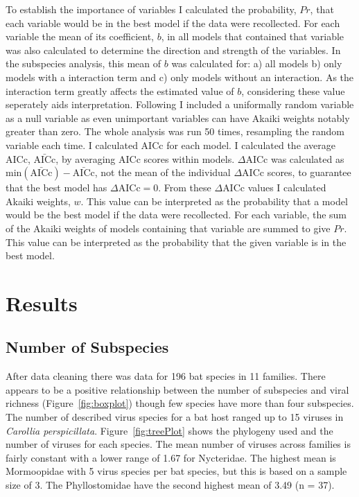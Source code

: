 To establish the importance of variables I calculated the probability, $Pr$, that each variable would be in the best model if the data were recollected.
For each variable the mean of its coefficient, $b$, in all models that contained that variable was also calculated to determine the direction and strength of the variables.
In the subspecies analysis, this mean of $b$ was calculated for: a) all models b) only models with a interaction term and c) only models without an interaction.
As the interaction term greatly affects the estimated value of $b$, considering these value seperately aids interpretation.
Following \cite{whittingham2005habitat} I included a uniformally random variable as a null variable as even unimportant variables can have Akaiki weights notably greater than zero.
The whole analysis was run 50 times, resampling the random variable each time.
I calculated AICc for each model.
I calculated the average AICc, $\bar{\text{AICc}}$, by averaging AICc scores within models.
$\Delta\text{AICc}$ was calculated as $\text{min}(\bar{\text{AICc}}) - \bar{\text{AICc}}$, not the mean of the individual $\Delta\text{AICc}$ scores, to guarantee that the best model has $\Delta\text{AICc} = 0$.
From these $\Delta\text{AICc}$ values I calculated Akaiki weights, $w$.
This value can be interpreted as the probability that a model would be the best model if the data were recollected.
For each variable, the sum of the Akaiki weights of models containing that variable are summed to give $Pr$.
This value can be interpreted as the probability that the given variable is in the best model.




\section{Results}


\subsection{Number of Subspecies}

After data cleaning there was data for 196 bat species in 11 families.
There appears to be a positive relationship between the number of subspecies and viral richness (Figure~\ref{fig:boxplot}) though few species have more than four subspecies. 
The number of described virus species for a bat host ranged up to 15 viruses in \emph{Carollia perspicillata}.
Figure~\ref{fig:treePlot} shows the phylogeny used and the number of viruses for each species.
The mean number of viruses across families is fairly constant with a lower range of 1.67 for Nycteridae.
The highest mean is Mormoopidae with 5 virus species per bat species, but this is based on a sample size of 3.
The Phyllostomidae have the second highest mean  of 3.49 (n = 37).

